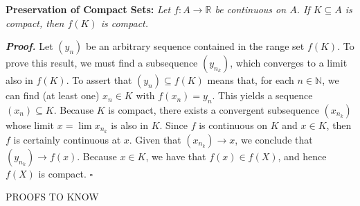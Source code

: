 \documentclass[12pt, a4paper]{article}
\begin{document}
\textbf{Preservation of Compact Sets:} \textit{Let $f\colon A\rightarrow\mathbb{R}$ be continuous on $A$. If $K\subseteq A$ is compact, then $f(K)$ is compact.}

\begin{description}
    \item\textit{\textbf{Proof.}} Let $(y_n)$ be an arbitrary sequence contained in the range set $f(K)$. To prove this result, we must find a subsequence $(y_{n_k})$, which converges to a limit also in $f(K)$. To assert that $(y_n)\subseteq f(K)$ means that, for each $n\in\mathbb{N}$, we can find (at least one) $x_n\in K$ with $f(x_n)=y_n$. This yields a sequence $(x_n)\subseteq K$. Because $K$ is compact, there exists a convergent subsequence $(x_{n_k})$ whose limit $x=\lim x_{n_k}$ is also in $K$. Since $f$ is continuous on $K$ and $x\in K$, then $f$ is certainly continuous at $x$. Given that $(x_{n_k})\rightarrow x$, we conclude that $(y_{n_k})\rightarrow f(x)$. Because $x\in K$, we have that $f(x)\in f(X)$, and hence $f(X)$ is compact. $\square$ 
\end{description}

\newpage

\hline

\vspace{2mm}

\centerline{PROOFS TO KNOW}

\vspace{2mm}

\hline
\end{document}
